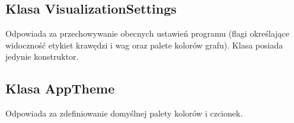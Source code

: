 \documentclass[]{article}
\begin{document}
    \subsection{Klasa VisualizationSettings}

    Odpowiada za przechowywanie obecnych ustawień programu (flagi określające widoczność etykiet krawędzi i wag oraz palete kolorów grafu). Klasa posiada jedynie konstruktor.

    \subsection{Klasa AppTheme}
    Odpowiada za zdefiniowanie domyślnej palety kolorów i czcionek.
\end{document}
